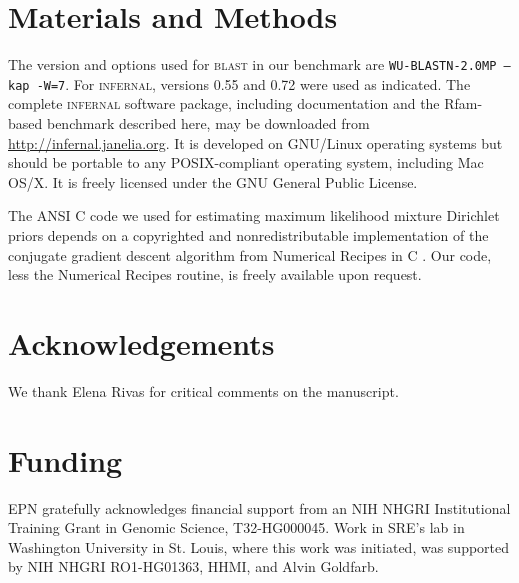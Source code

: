 \documentclass[11pt]{article}
\newif\ifdraft
\begin{document}
\section{Materials and Methods}

The version and options used for \textsc{blast} in our benchmark are
\texttt{WU-BLASTN-2.0MP --kap -W=7}.  For \textsc{infernal}, versions 0.55
and 0.72 were used as indicated. The complete \textsc{infernal}
software package, including documentation and the Rfam-based benchmark
described here, may be downloaded from
\url{http://infernal.janelia.org}. It is developed on GNU/Linux
operating systems but should be portable to any POSIX-compliant
operating system, including Mac OS/X. It is freely licensed under the
GNU General Public License.

The ANSI C code we used for estimating maximum likelihood mixture
Dirichlet priors depends on a copyrighted and nonredistributable
implementation of the conjugate gradient descent algorithm from
Numerical Recipes in C \cite{Press93}. Our code, less the Numerical
Recipes routine, is freely available upon request.


\section{Acknowledgements}
We thank Elena Rivas for critical comments on the manuscript.

\section{Funding}
EPN gratefully acknowledges financial support from an NIH NHGRI
Institutional Training Grant in Genomic Science, T32-HG000045. Work in
SRE's lab in Washington University in St. Louis, where this work was
initiated, was supported by NIH NHGRI RO1-HG01363, HHMI, and Alvin
Goldfarb. 

\newpage
%


\ifdraft
 \relax
\else

\newpage


\newpage


\newpage


\newpage


\newpage


\newpage


\newpage


\newpage


\newpage


\newpage


\newpage

\fi
\end{document}
